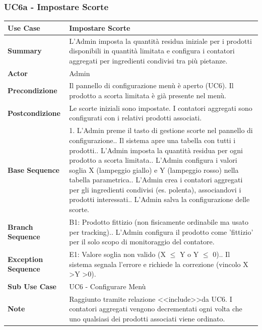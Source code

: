 \newpage 

\subsubsection*{UC6a - Impostare Scorte}
\begin{center}
\begin{tabular}{|p{}|p{}|}
\hline
\textbf{Use Case} & Impostare Scorte \\ \hline
\textbf{Summary} & L'Admin imposta la quantità residua iniziale per i prodotti disponibili in quantità limitata e configura i contatori aggregati per ingredienti condivisi tra più pietanze. \\ \hline
\textbf{Actor} & Admin \\ \hline
\textbf{Precondizione} & Il pannello di configurazione menù è aperto (UC6). Il prodotto a scorta limitata è già presente nel menù. \\ \hline
\textbf{Postcondizione} & Le scorte iniziali sono impostate. I contatori aggregati sono configurati con i relativi prodotti associati. \\ \hline
\textbf{Base Sequence} & 1. L'Admin preme il tasto di gestione scorte nel pannello di configurazione.\newline 2. Il sistema apre una tabella con tutti i prodotti.\newline 3. L'Admin imposta la quantità residua per ogni prodotto a scorta limitata.\newline 4. L'Admin configura i valori soglia X (lampeggio giallo) e Y (lampeggio rosso) nella tabella parametrica.\newline 5. L'Admin crea i contatori aggregati per gli ingredienti condivisi (es. polenta), associandovi i prodotti interessati.\newline 6. L'Admin salva la configurazione delle scorte. \\ \hline
\textbf{Branch Sequence} & B1: Prodotto fittizio (non fisicamente ordinabile ma usato per tracking).\newline 3. L'Admin configura il prodotto come 'fittizio' per il solo scopo di monitoraggio del contatore. \\ \hline
\textbf{Exception Sequence} & E1: Valore soglia non valido (X $\le$ Y o Y $\le$ 0).\newline 4. Il sistema segnala l'errore e richiede la correzione (vincolo X \textgreater Y \textgreater 0). \\ \hline
\textbf{Sub Use Case} & UC6 - Configurare Menù \\ \hline
\textbf{Note} & Raggiunto tramite relazione \textless\textless include\textgreater\textgreater da UC6. I contatori aggregati vengono decrementati ogni volta che uno qualsiasi dei prodotti associati viene ordinato. \\ \hline
\end{tabular}
\end{center}

